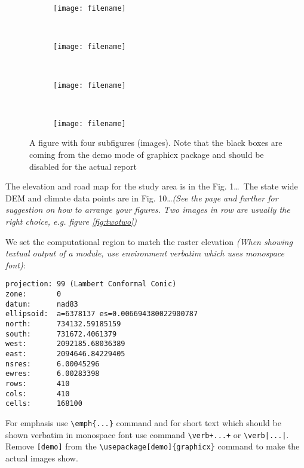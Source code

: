\documentclass[10pt]{article}
\newcommand{\twobytwoimgwidth}{0.4\textwidth}
\begin{document}
\begin{figure}[htbp]
  \centering
  \begin{subfigure}[b]{\twobytwoimgwidth}
    \texttt{[image: filename]}
    \caption{}
  \end{subfigure}%
  ~ %
  \begin{subfigure}[b]{\twobytwoimgwidth}
    \texttt{[image: filename]}
    \caption{}
  \end{subfigure}
  \\[0.01\textheight]
    \begin{subfigure}[b]{\twobytwoimgwidth}
    \texttt{[image: filename]}
    \caption{}
  \end{subfigure}
  ~
  \begin{subfigure}[b]{\twobytwoimgwidth}
    \texttt{[image: filename]}
    \caption{}
  \end{subfigure}%
  \caption{A figure with four subfigures (images).
    Note that the black boxes are coming from the demo mode of graphicx package
    and should be disabled for the actual report}
  \label{fig:afigure}
\end{figure}

The elevation and road map for the study area is in the Fig. 1\ldots\ The state wide DEM
and climate data points are in Fig. 10\ldots \emph{(See the page \pageref{fig:figure-internal-label} and further
for suggestion on how to arrange your figures. Two images in row are usually the right choice,
e.g. figure \ref{fig:twotwo})}

We set the computational region to match the raster elevation
\emph{(When showing textual output of a module, use environment verbatim which uses monospace font)}:
\begin{verbatim}
projection: 99 (Lambert Conformal Conic)
zone:       0
datum:      nad83
ellipsoid:  a=6378137 es=0.006694380022900787
north:      734132.59185159
south:      731672.4061379
west:       2092185.68036389
east:       2094646.84229405
nsres:      6.00045296
ewres:      6.00283398
rows:       410
cols:       410
cells:      168100
\end{verbatim}
For emphasis use \verb|\emph{...}| command and for short text which should be shown
verbatim in monospace font use command \verb|\verb+...+| or \verb+\verb|...|+.
Remove \verb|[demo]| from the \verb|\usepackage[demo]{graphicx}| command
to make the actual images show.
\end{document}
